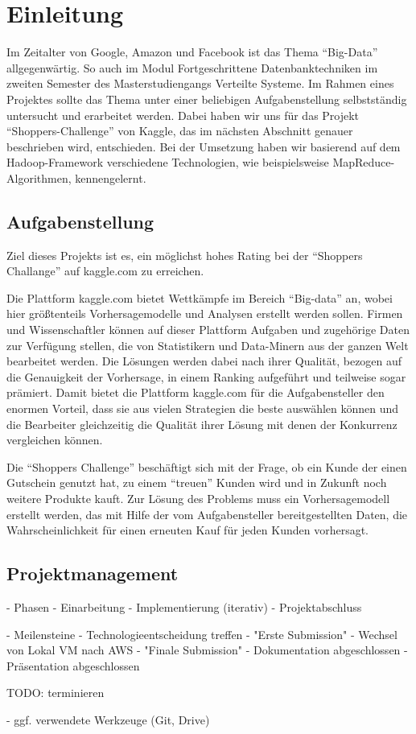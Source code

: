 \section{Einleitung}
Im Zeitalter von Google, Amazon und Facebook ist das Thema "`Big-Data"' allgegenwärtig. So auch im Modul Fortgeschrittene Datenbanktechniken im zweiten Semester des Masterstudiengangs Verteilte Systeme. Im Rahmen eines Projektes sollte das Thema unter einer beliebigen Aufgabenstellung selbstständig untersucht und erarbeitet werden. Dabei haben wir uns für das Projekt "`Shoppers-Challenge"' von Kaggle, das im nächsten Abschnitt genauer beschrieben wird, entschieden. Bei der Umsetzung haben wir basierend auf dem Hadoop-Framework verschiedene Technologien, wie beispielsweise MapReduce-Algorithmen, kennengelernt.

\subsection{Aufgabenstellung}
Ziel dieses Projekts ist es, ein möglichst hohes Rating bei der "`Shoppers Challange"' auf kaggle.com zu erreichen.

Die Plattform kaggle.com bietet Wettkämpfe im Bereich "`Big-data"' an, wobei hier größtenteils Vorhersagemodelle und Analysen erstellt werden sollen. Firmen und Wissenschaftler können auf dieser Plattform Aufgaben und zugehörige Daten zur Verfügung stellen, die von Statistikern und Data-Minern aus der ganzen Welt bearbeitet werden. Die Lösungen werden dabei nach ihrer Qualität, bezogen auf die Genauigkeit der Vorhersage, in einem Ranking aufgeführt und teilweise sogar prämiert. Damit bietet die Plattform kaggle.com für die Aufgabensteller den enormen Vorteil, dass sie aus vielen Strategien die beste auswählen können und die Bearbeiter gleichzeitig die Qualität ihrer Lösung mit denen der Konkurrenz vergleichen können.

Die "`Shoppers Challenge"' beschäftigt sich mit der Frage, ob ein Kunde der einen Gutschein genutzt hat, zu einem "`treuen"' Kunden wird und in Zukunft noch weitere Produkte kauft. Zur Lösung des Problems muss ein Vorhersagemodell erstellt werden, das mit Hilfe der vom Aufgabensteller bereitgestellten Daten, die Wahrscheinlichkeit für einen erneuten Kauf für jeden Kunden vorhersagt. 

\subsection{Projektmanagement}
- Phasen
	- Einarbeitung
	- Implementierung (iterativ)
	- Projektabschluss
	
- Meilensteine
	- Technologieentscheidung treffen
	- "Erste Submission"
	- Wechsel von Lokal VM nach AWS
	- "Finale Submission" 
	- Dokumentation abgeschlossen
	- Präsentation abgeschlossen
	
	TODO: terminieren
	
- ggf. verwendete Werkzeuge (Git, Drive)





